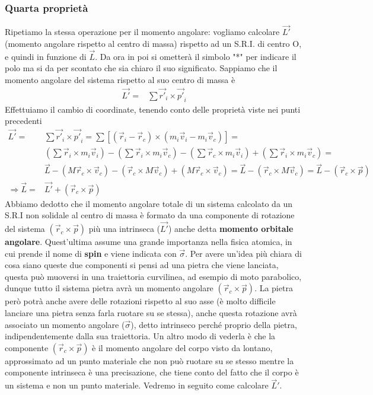 \subsubsection{Quarta proprietà}\label{sec:quartaprop}
Ripetiamo la stessa operazione per il momento angolare: vogliamo calcolare $\vec{L'}$ (momento angolare rispetto al centro di massa) rispetto ad un S.R.I. di centro O, e quindi in funzione di $\vec{L}$. Da ora in poi si ometterà il simbolo "*" per indicare il polo ma si da per scontato che sia chiaro il suo significato. Sappiamo che il momento angolare del sistema rispetto al suo centro di massa è
\begin{align*}
	\vec{L'}=& \sum\vec{r'}_i \times \vec{p'}_i
\end{align*}
Effettuiamo il cambio di coordinate, tenendo conto delle proprietà viste nei punti precedenti
\begin{align*}
	\vec{L'}=& \sum\vec{r'}_i \times \vec{p'}_i= \sum [(\vec{r}_i-\vec{r}_c) \times (m_i\vec{v}_i-m_i\vec{v}_c)]=\\
	&(\sum\vec{r}_i\times m_i \vec{v}_i)-(\sum\vec{r}_i\times m_i \vec{v}_c)-(\sum\vec{r}_c\times m_i \vec{v}_i)+(\sum\vec{r}_i\times m_i \vec{v}_c)=\\
	&\vec{L}-(M \vec{r}_c \times \vec{v}_c)-(\vec{r}_c \times M \vec{v}_c)+(M \vec{r}_c \times \vec{v}_c)=\vec{L}-(\vec{r}_c \times M \vec{v}_c)=\vec{L}-(\vec{r}_c \times \vec{p})\\
	\Rightarrow \vec{L} =& \vec{L'}+ (\vec{r}_c \times \vec{p})
\end{align*}
Abbiamo dedotto che il momento angolare totale di un sistema calcolato da un S.R.I non solidale al centro di massa è formato da una componente di rotazione del sistema $(\vec{r}_c \times \vec{p})$ più una intrinseca ($\vec{L'}$) anche detta \textbf{momento orbitale angolare}. Quest'ultima assume una grande importanza nella fisica atomica, in cui prende il nome di \textbf{spin} e viene indicata con $\vec{\sigma}$. Per avere un'idea più chiara di cosa siano queste due componenti si pensi ad una pietra che viene lanciata, questa può muoversi in una traiettoria curvilinea, ad esempio di moto parabolico, dunque tutto il sistema pietra avrà un momento angolare $(\vec{r}_c \times \vec{p})$. La pietra però potrà anche avere delle rotazioni rispetto al suo asse (è molto difficile lanciare una pietra senza farla ruotare su se stessa), anche questa rotazione avrà associato un momento angolare ($\vec{\sigma}$), detto intrinseco perché proprio della pietra, indipendentemente dalla sua traiettoria. Un altro modo di vederla è che la componente $(\vec{r}_c \times \vec{p})$ è il momento angolare del corpo visto da lontano, approssimato ad un punto materiale che non può ruotare su se stesso mentre la componente intrinseca è una precisazione, che tiene conto del fatto che il corpo è un sistema e non un punto materiale. Vedremo in seguito come calcolare $\vec{L}'$. 
 
